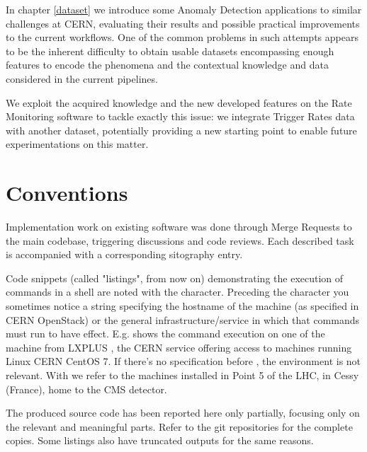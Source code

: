 In chapter \ref{dataset} we introduce some Anomaly Detection applications to similar challenges at CERN, evaluating their results and possible practical improvements to the current workflows. One of the common problems in such attempts appears to be the inherent difficulty to obtain usable datasets encompassing enough features to encode the phenomena and the contextual knowledge and data considered in the current pipelines.

We exploit the acquired knowledge and the new developed features on the Rate Monitoring software to tackle exactly this issue: we integrate Trigger Rates data with another dataset, potentially providing a new starting point to enable future experimentations on this matter.


\section{Conventions}

Implementation work on existing software was done through Merge Requests to the main codebase, triggering discussions and code reviews. Each described task is accompanied with a corresponding sitography entry.

Code snippets (called "listings", from now on) demonstrating the execution of commands in a shell are noted with the \mcode{\$} character. Preceding the \mcode{\$} character you sometimes notice a string specifying the hostname of the machine (as specified in CERN OpenStack) or the general infrastructure/service in which that commands must run to have effect. E.g.  shows the command execution on one of the machine from LXPLUS \cite{LXPLUSServiceITDepartment-2020-10-01}, the CERN service offering access to machines running Linux CERN CentOS 7. If there's no specification before \mcode{\$}, the environment is not relevant. With  we refer to the machines installed in Point 5 of the LHC, in Cessy (France), home to the CMS detector.

The produced source code has been reported here only partially, focusing only on the relevant and meaningful parts. Refer to the git repositories for the complete copies. Some listings also have truncated outputs for the same reasons.